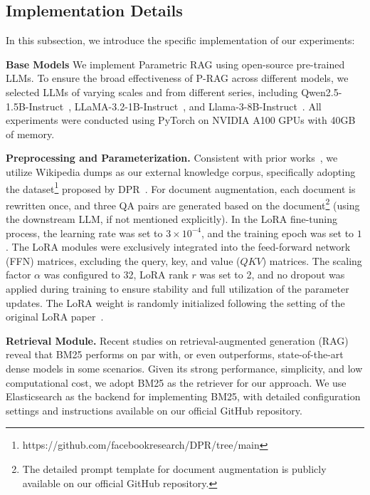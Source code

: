\documentclass[sigconf,natbib=true,anonymous=false]{acmart}
\begin{document}
\subsection{Implementation Details}
\label{sec:implementation}

In this subsection, we introduce the specific implementation of our experiments:

\textbf{Base Models}
We implement Parametric RAG using open-source pre-trained LLMs. 
To ensure the broad effectiveness of P-RAG across different models, we selected LLMs of varying scales and from different series, including Qwen2.5-1.5B-Instruct~\citep{yang2024qwen2}, LLaMA-3.2-1B-Instruct~\citep{Llama-3.2-1B-Instruct}, and Llama-3-8B-Instruct~\cite{Llama-3-8B-Instruct}. All experiments were conducted using PyTorch on NVIDIA A100 GPUs with 40GB of memory.

\textbf{Preprocessing and Parameterization.} 
Consistent with prior works~\cite{karpukhin2020dense,jiang2023active,su2024dragin,su2024mitigating}, we utilize Wikipedia dumps as our external knowledge corpus, specifically adopting the dataset\footnote{https://github.com/facebookresearch/DPR/tree/main} proposed by DPR~\cite{karpukhin2020dense}.
For document augmentation, each document is rewritten once, and three QA pairs are generated based on the document\footnote{The detailed prompt template for document augmentation is publicly available on our official GitHub repository.} (using the downstream LLM, if not mentioned explicitly).
In the LoRA fine-tuning process, the learning rate was set to $3 \times 10^{-4}$, and the training epoch was set to $1$. The LoRA modules were exclusively integrated into the feed-forward network (FFN) matrices, excluding the query, key, and value ($QKV$) matrices. 
The scaling factor $\alpha$ was configured to 32, LoRA rank $r$ was set to 2, and no dropout was applied during training to ensure stability and full utilization of the parameter updates.
The LoRA weight is randomly initialized following the setting of the original LoRA paper~\cite{hulora}.




\textbf{Retrieval Module.} 
Recent studies on retrieval-augmented generation (RAG)~\cite{ram2023context} reveal that BM25 performs on par with, or even outperforms, state-of-the-art dense models in some scenarios. 
Given its strong performance, simplicity, and low computational cost, we adopt BM25 as the retriever for our approach.
We use Elasticsearch as the backend for implementing BM25, with detailed configuration settings and instructions available on our official GitHub repository.
\end{document}
